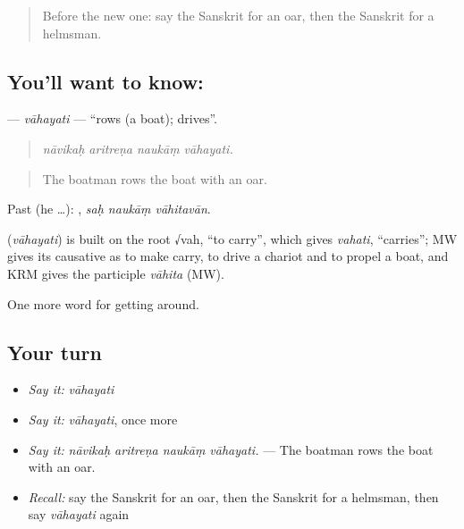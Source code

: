 \label{lesson:SA-C416-vahayati}



\begin{quote}
Before the new one: say the Sanskrit for an oar, then the Sanskrit for a helmsman.
\end{quote}

\subsection*{You'll want to know: }
\textbf{} — \emph{vāhayati} — \textquotedblleft{}rows (a boat); drives\textquotedblright{}.

\begin{quote}
   
\end{quote}

\begin{quote}
\emph{nāvikaḥ aritreṇa naukāṃ vāhayati.}
\end{quote}

\begin{quote}
The boatman rows the boat with an oar.
\end{quote}

Past (he …):   , \emph{saḥ naukāṃ vāhitavān}.

\begin{cousinweb}
\textbf{} (\emph{vāhayati}) is built on the root √vah, \textquotedblleft{}to carry\textquotedblright{}, which gives \emph{vahati}, \textquotedblleft{}carries\textquotedblright{}; MW gives its causative as to make carry, to drive a chariot and to propel a boat, and KRM gives the participle \emph{vāhita} (MW).
\end{cousinweb}

\begin{grammarlens}[title={What you've built}]
One more word for getting around.
\end{grammarlens}

\subsection*{Your turn}
\begin{itemize}
\raggedright
  \item \emph{Say it:} \emph{vāhayati}
  \item \emph{Say it:} \emph{vāhayati}, once more
  \item \emph{Say it:} \emph{nāvikaḥ aritreṇa naukāṃ vāhayati.} — The boatman rows the boat with an oar.
  \item \emph{Recall:} say the Sanskrit for an oar, then the Sanskrit for a helmsman, then say \emph{vāhayati} again
\end{itemize}

